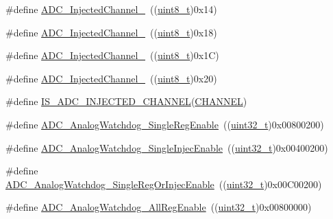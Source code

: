 \begin{DoxyCompactItemize}
\item 
\#define \hyperlink{group___a_d_c__injected__channel__selection_ga8792d4ae0fa82dd317252c72815684ba}{A\+D\+C\+\_\+\+Injected\+Channel\+\_}~((\hyperlink{_p_e___types_8h_aba7bc1797add20fe3efdf37ced1182c5}{uint8\+\_\+t})0x14)
\item 
\#define \hyperlink{group___a_d_c__injected__channel__selection_ga2e322fccc7de16a0e79be573f5b1211c}{A\+D\+C\+\_\+\+Injected\+Channel\+\_}~((\hyperlink{_p_e___types_8h_aba7bc1797add20fe3efdf37ced1182c5}{uint8\+\_\+t})0x18)
\item 
\#define \hyperlink{group___a_d_c__injected__channel__selection_ga6bf03d805645b942bdcc53504e772cf1}{A\+D\+C\+\_\+\+Injected\+Channel\+\_}~((\hyperlink{_p_e___types_8h_aba7bc1797add20fe3efdf37ced1182c5}{uint8\+\_\+t})0x1\+C)
\item 
\#define \hyperlink{group___a_d_c__injected__channel__selection_ga31d18bbcfa7b685e90c3a1313d9c6406}{A\+D\+C\+\_\+\+Injected\+Channel\+\_}~((\hyperlink{_p_e___types_8h_aba7bc1797add20fe3efdf37ced1182c5}{uint8\+\_\+t})0x20)
\item 
\#define \hyperlink{group___a_d_c__injected__channel__selection_gae0bbfb5dbad0fbac8b672db6f63cf8d0}{I\+S\+\_\+\+A\+D\+C\+\_\+\+I\+N\+J\+E\+C\+T\+E\+D\+\_\+\+C\+H\+A\+N\+N\+EL}(\hyperlink{samr21__xpro_200std__low__power__mode_200std__low__power__mode_8c_ace6a11e892466500d47d1f45f042bc53}{C\+H\+A\+N\+N\+EL})
\item 
\#define \hyperlink{group___a_d_c__analog__watchdog__selection_ga2975552a752f44085d9da54b4e76121e}{A\+D\+C\+\_\+\+Analog\+Watchdog\+\_\+\+Single\+Reg\+Enable}~((\hyperlink{_p_e___types_8h_a33594304e786b158f3fb30289278f5af}{uint32\+\_\+t})0x00800200)
\item 
\#define \hyperlink{group___a_d_c__analog__watchdog__selection_gaa9904271617ab69593ac68ae540047fb}{A\+D\+C\+\_\+\+Analog\+Watchdog\+\_\+\+Single\+Injec\+Enable}~((\hyperlink{_p_e___types_8h_a33594304e786b158f3fb30289278f5af}{uint32\+\_\+t})0x00400200)
\item 
\#define \hyperlink{group___a_d_c__analog__watchdog__selection_gaffd35fc6ceb226ec3fb61fb52227820c}{A\+D\+C\+\_\+\+Analog\+Watchdog\+\_\+\+Single\+Reg\+Or\+Injec\+Enable}~((\hyperlink{_p_e___types_8h_a33594304e786b158f3fb30289278f5af}{uint32\+\_\+t})0x00\+C00200)
\item 
\#define \hyperlink{group___a_d_c__analog__watchdog__selection_ga37f08e1a4a452a2c148341b3cfcdeb1e}{A\+D\+C\+\_\+\+Analog\+Watchdog\+\_\+\+All\+Reg\+Enable}~((\hyperlink{_p_e___types_8h_a33594304e786b158f3fb30289278f5af}{uint32\+\_\+t})0x00800000)

\end{DoxyCompactItemize}
